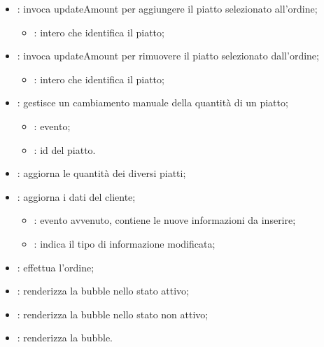 \begin{itemize}
	\item {}: invoca updateAmount per aggiungere il piatto selezionato all'ordine;
		\begin{itemize}
			\item {}: intero che identifica il piatto;
		\end{itemize}
	\item {}: invoca updateAmount per rimuovere il piatto selezionato dall'ordine;
		\begin{itemize}
			\item {}: intero che identifica il piatto;
		\end{itemize}
	\item {}: gestisce un cambiamento manuale della quantità di un piatto;
		\begin{itemize}
			\item {}: evento;
			\item {}: id del piatto.
		\end{itemize}
	\item {}: aggiorna le quantità dei diversi piatti;
	\item {}: aggiorna i dati del cliente;
		\begin{itemize}
			\item {}: evento avvenuto, contiene le nuove informazioni da inserire;
			\item {}: indica il tipo di informazione modificata;
		\end{itemize}
	\item {}: effettua l'ordine;
	\item {}: renderizza la bubble nello stato attivo;
	\item {}: renderizza la bubble nello stato non attivo;
	\item {}: renderizza la bubble.
\end{itemize}

